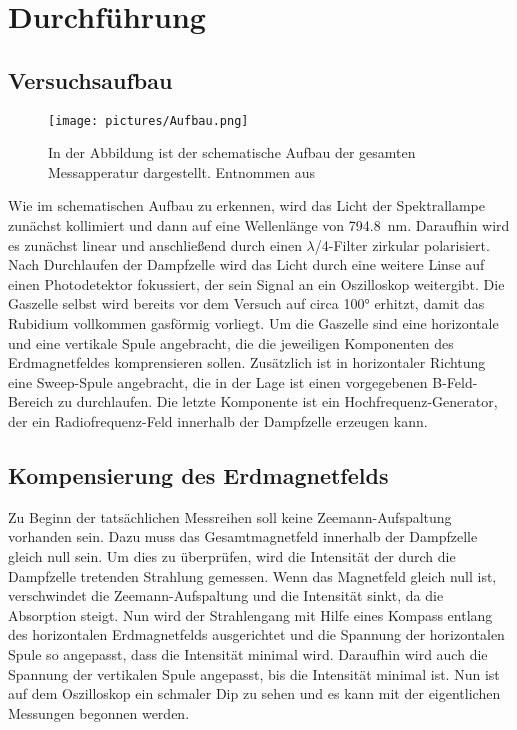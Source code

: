 \newpage
\section{Durchführung}
    \subsection{Versuchsaufbau}

        \FloatBarrier

        \begin{figure}[h]
          \centering
          \texttt{[image: pictures/Aufbau.png]}
          \caption{In der Abbildung ist der schematische Aufbau der gesamten Messapperatur dargestellt. Entnommen aus \cite{tu_dortmund_versuchsanleitung_2021}}
          \label{fig:Aufbau}
        \end{figure}

        \FloatBarrier

        \noindent
        Wie im schematischen Aufbau zu erkennen, wird das Licht der Spektrallampe zunächst kollimiert und dann auf eine Wellenlänge von \SI{794.8}{\nano\metre}. Daraufhin wird es zunächst linear und anschließend 
        durch einen $\lambda$/4-Filter zirkular polarisiert. Nach Durchlaufen der Dampfzelle wird das Licht durch eine weitere Linse auf einen Photodetektor fokussiert, der sein Signal an ein Oszilloskop 
        weitergibt. Die Gaszelle selbst wird bereits vor dem Versuch auf circa 100° erhitzt, damit das Rubidium vollkommen gasförmig vorliegt. Um die Gaszelle sind eine horizontale und eine vertikale Spule 
        angebracht, die die jeweiligen Komponenten des Erdmagnetfeldes komprensieren sollen. Zusätzlich ist in horizontaler Richtung eine Sweep-Spule angebracht, die in der Lage ist einen vorgegebenen 
        B-Feld-Bereich zu durchlaufen. Die letzte Komponente ist ein Hochfrequenz-Generator, der ein Radiofrequenz-Feld innerhalb der Dampfzelle erzeugen kann.

    \subsection{Kompensierung des Erdmagnetfelds}
        Zu Beginn der tatsächlichen Messreihen soll keine Zeemann-Aufspaltung vorhanden sein. Dazu muss das Gesamtmagnetfeld innerhalb der Dampfzelle gleich null sein. Um dies zu überprüfen, wird die Intensität
        der durch die Dampfzelle tretenden Strahlung gemessen. Wenn das Magnetfeld gleich null ist, verschwindet die Zeemann-Aufspaltung und die Intensität sinkt, da die Absorption steigt. Nun wird der 
        Strahlengang mit Hilfe eines Kompass entlang des horizontalen Erdmagnetfelds ausgerichtet und die Spannung der horizontalen Spule so angepasst, dass die Intensität minimal wird. Daraufhin wird auch die
        Spannung der vertikalen Spule angepasst, bis die Intensität minimal ist. Nun ist auf dem Oszilloskop ein schmaler Dip zu sehen und es kann mit der eigentlichen Messungen begonnen werden.  

